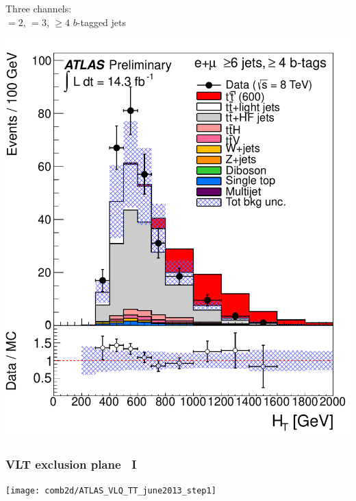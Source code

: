 \documentclass[xcolor=dvipsnames,10pt]{beamer}
\begin{document}
\begin{frame}
\begin{minipage}{.55\textwidth}
\begin{minipage}{.6\textwidth}
\end{minipage}

     \end{minipage}\begin{minipage}{.45\textwidth}\centering


\begin{minipage}{1.\textwidth}\centering

\myskip

       Three channels:\\ $=2$, $=3$, \alert{$\geq 4$ $b$-tagged jets}

       \includegraphics[width=.8\textwidth]{htx/fig_04c.pdf}

     \end{minipage}
\end{minipage}

\end{frame}



\begin{frame}\frametitle{VLT exclusion plane~\cite{combination} I}
\footnotesize\centering

\texttt{[image: comb2d/ATLAS\_VLQ\_TT\_june2013\_step1]}

\end{frame}
\end{document}
